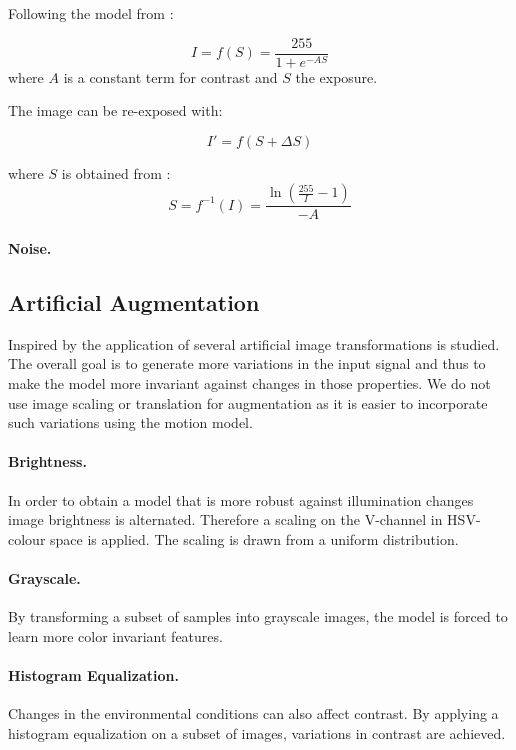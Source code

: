 Following the model from \cite{Carlson2018}:
 
\begin{equation}
 I = f(S) = \frac{255}{1 + e^{-A S}}
\end{equation}
where $A$ is a constant term for contrast and $S$ the exposure.

The image can be re-exposed with:

\begin{equation}
	I' = f(S+\Delta S)
\end{equation}

where $S$ is obtained from :
\begin{equation}
S = f^{-1}(I) = \frac{\ln(\frac{255}{I}-1)}{-A}
\end{equation}

\paragraph{Noise.}

\subsection{Artificial Augmentation}

Inspired by \cite{Howard2013, Redmon, Liu} the application of several artificial image transformations is studied. The overall goal is to generate more variations in the input signal and thus to make the model more invariant against changes in those properties. We do not use image scaling or translation for augmentation as it is easier to incorporate such variations using the motion model.

\paragraph{Brightness.} In order to obtain a model that is more robust against illumination changes image brightness is alternated. Therefore a scaling on the V-channel in HSV-colour space is applied. The scaling is drawn from a uniform distribution.
	
\paragraph{Grayscale.} By transforming a subset of samples into grayscale images, the model is forced to learn more color invariant features. 
	
\paragraph{Histogram Equalization.} Changes in the environmental conditions can also affect contrast. By applying a histogram equalization on a subset of images, variations in contrast are achieved. 
	
